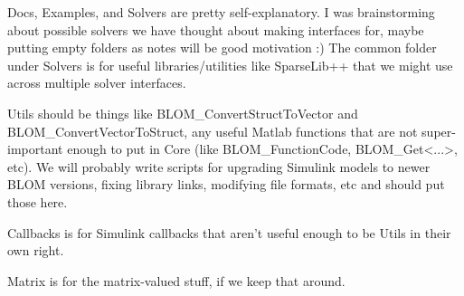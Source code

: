 Docs, Examples, and Solvers are pretty self-explanatory. I was brainstorming about possible solvers we have thought about making interfaces for, maybe putting empty folders as notes will be good motivation :)
The common folder under Solvers is for useful libraries/utilities like SparseLib++ that we might use across multiple solver interfaces.

Utils should be things like BLOM_ConvertStructToVector and BLOM_ConvertVectorToStruct, any useful Matlab functions that are not super-important enough to put in Core (like BLOM_FunctionCode, BLOM_Get<...>, etc). We will probably write scripts for upgrading Simulink models to newer BLOM versions, fixing library links, modifying file formats, etc and should put those here.

Callbacks is for Simulink callbacks that aren't useful enough to be Utils in their own right.

Matrix is for the matrix-valued stuff, if we keep that around.

